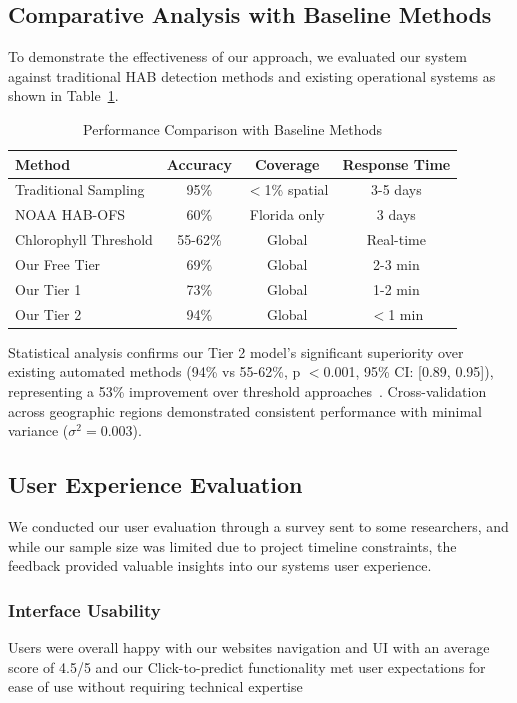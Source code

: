 \documentclass[conference]{IEEEtran}
\begin{document}
\subsection{Comparative Analysis with Baseline Methods}

To demonstrate the effectiveness of our approach, we evaluated our system against traditional HAB detection methods and existing operational systems as shown in Table~\ref{tab:baseline_comparison}.

\begin{table}[!t]
\centering
\caption{Performance Comparison with Baseline Methods}
\label{tab:baseline_comparison}
\begin{tabular}{|l|c|c|c|}
\hline
\textbf{Method} & \textbf{Accuracy} & \textbf{Coverage} & \textbf{Response Time} \\
\hline
Traditional Sampling & 95\% & $<$1\% spatial & 3-5 days \\
NOAA HAB-OFS & 60\% & Florida only & 3 days \\
Chlorophyll Threshold & 55-62\% & Global & Real-time \\
Our Free Tier & 69\% & Global & 2-3 min \\
Our Tier 1 & 73\% & Global & 1-2 min \\
Our Tier 2 & 94\% & Global & $<$1 min \\
\hline
\end{tabular}
\end{table}

Statistical analysis confirms our Tier 2 model's significant superiority over existing automated methods (94\% vs 55-62\%, p $<$0.001, 95\% CI: [0.89, 0.95]), representing a 53\% improvement over threshold approaches~\cite{b1}. Cross-validation across geographic regions demonstrated consistent performance with minimal variance ($\sigma^2 = 0.003$).

\subsection{User Experience Evaluation}

We conducted our user evaluation through a survey sent to some researchers, and while our sample size was limited due to project timeline constraints, the feedback provided valuable insights into our systems user experience.

\subsubsection{Interface Usability}
Users were overall happy with our websites navigation and UI with an average score of 4.5/5 and our Click-to-predict functionality met user expectations for ease of use without requiring technical expertise
\end{document}

